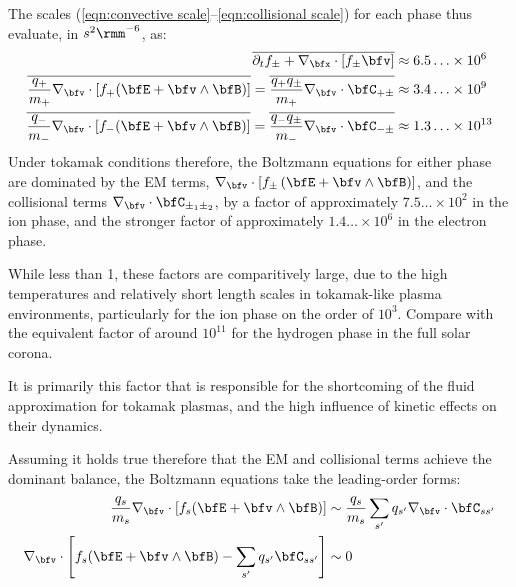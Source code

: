     The scales (\ref{eqn:convective scale}–\ref{eqn:collisional scale}) for each phase thus evaluate, in $s^{2}\rmm^{- 6}$, as:
    \begin{align}
        \overline{\partial_{t}f_{\pm} + \nabla_{\bfx}\cdot[f_{\pm}\bfv]}  &\approx  6.5\ldots\times 10^{6}  \\
        \overline{\frac{q_{+}}{m_{+}}\nabla_{\bfv}\cdot[f_{+}(\bfE + \bfv\wedge\bfB)]}  =  \overline{\frac{q_{+}q_{\pm}}{m_{+}}\nabla_{\bfv}\cdot\bfC_{+\pm}}  &\approx  3.4\ldots\times 10^{9}  \\
        \overline{\frac{q_{-}}{m_{-}}\nabla_{\bfv}\cdot[f_{-}(\bfE + \bfv\wedge\bfB)]}  =  \overline{\frac{q_{-}q_{\pm}}{m_{-}}\nabla_{\bfv}\cdot\bfC_{-\pm}}  &\approx  1.3\ldots\times 10^{13}
    \end{align}
    Under tokamak conditions therefore, the Boltzmann equations for either phase are dominated by the EM terms, $\nabla_{\bfv}\cdot[f_{\pm}\left(\bfE + \bfv\wedge\bfB\right)]$, and the collisional terms $\nabla_{\bfv}\cdot\bfC_{\pm_{1}\pm_{2}}$, by a factor of approximately $7.5\ldots\times 10^{2}$ in the ion phase, and the stronger factor of approximately $1.4\ldots\times 10^{6}$ in the electron phase. 

    \begin{remark}
        While less than 1, these factors are comparitively large, due to the high temperatures and relatively short length scales in tokamak-like plasma environments, particularly for the ion phase on the order of $10^{3}$. Compare with the equivalent factor of around $10^{11}$ for the hydrogen phase in the full solar corona.

        It is primarily this factor that is responsible for the shortcoming of the fluid approximation for tokamak plasmas, and the high influence of kinetic effects on their dynamics.
    \end{remark}

    Assuming it holds true therefore that the EM and collisional terms achieve the dominant balance, the Boltzmann equations take the leading-order forms:
    \begin{align}\label{eqn:leading-order Boltzmann equation}
        \frac{q_{s}}{m_{s}}\nabla_{\bfv}\cdot[f_{s}(\bfE + \bfv\wedge\bfB)]  &\sim  \frac{q_{s}}{m_{s}}\sum_{s'}q_{s'}\nabla_{\bfv}\cdot\bfC_{ss'}  \\
        \nabla_{\bfv}\cdot\left[f_{s}(\bfE + \bfv\wedge\bfB) - \sum_{s'}q_{s'}\bfC_{ss'}\right]  &\sim  0
    \end{align}
    